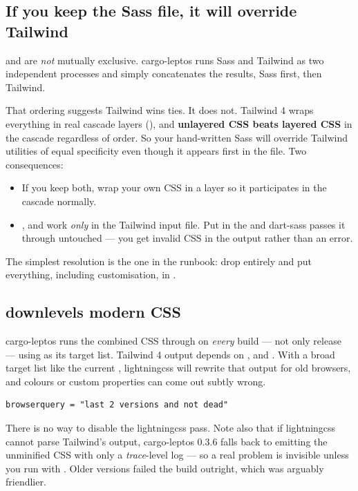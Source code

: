 \subsection{If you keep the Sass file, it will override Tailwind}

 and  are \emph{not} mutually exclusive. cargo-leptos
runs Sass and Tailwind as two independent processes and simply concatenates the results, Sass first,
then Tailwind.

That ordering suggests Tailwind wins ties. It does not. Tailwind 4 wraps everything in real cascade
layers (), and \textbf{unlayered CSS beats layered
CSS} in the cascade regardless of order. So your hand-written Sass will override Tailwind utilities
of equal specificity even though it appears first in the file. Two consequences:

\begin{itemize}
  \item If you keep both, wrap your own CSS in a layer so it participates in the cascade normally.
  \item {},  and  work \emph{only} in the Tailwind input file.
    Put  in the  and dart-sass passes it through untouched --- you get
    invalid CSS in the output rather than an error.
\end{itemize}

The simplest resolution is the one in the runbook: drop  entirely and put
everything, including  customisation, in .

\subsection{ downlevels modern CSS}

cargo-leptos runs the combined CSS through  on \emph{every} build --- not only
release --- using  as its target list. Tailwind 4 output depends on
,  and . With a broad target list like the current
, lightningcss will rewrite that output for old browsers, and colours or custom
properties can come out subtly wrong.

\begin{pattern}
\begin{lstlisting}[style=toml]
browserquery = "last 2 versions and not dead"
\end{lstlisting}
There is no way to disable the lightningcss pass. Note also that if lightningcss cannot parse
Tailwind's output, cargo-leptos 0.3.6 falls back to emitting the unminified CSS with only a
\emph{trace}-level log --- so a real problem is invisible unless you run with . Older
versions failed the build outright, which was arguably friendlier.
\end{pattern}

